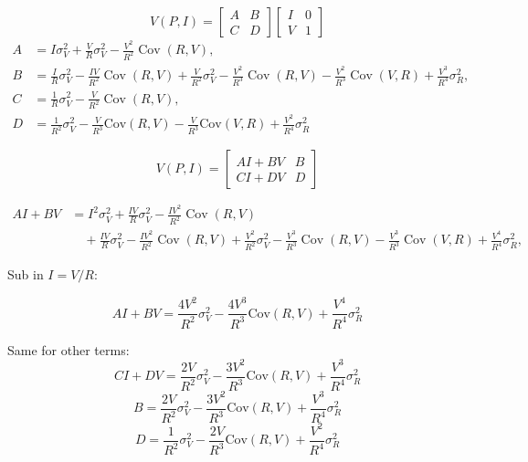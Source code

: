 \documentclass[10pt]{article}
\begin{document}
\begin{enumerate}[label=(\alph*)]
	      \[
		      V(P,I)=
		      \begin{bmatrix}
			      A & B \\[4pt]
			      C & D
		      \end{bmatrix}
		      \begin{bmatrix}
			      I & 0 \\[2pt]
			      V & 1
		      \end{bmatrix}
	      \]
	      \begin{align*}
		      A & = I\sigma_V^2 + \frac{V}{R}\sigma_V^2 - \frac{V^2}{R^2}\operatorname{Cov}(R,V),                                      \\[6pt]
		      B & = \frac{I}{R}\sigma_V^2 - \frac{IV}{R^2}\operatorname{Cov}(R,V)
		      + \frac{V}{R^2}\sigma_V^2 - \frac{V^2}{R^3}\operatorname{Cov}(R,V)
		      - \frac{V^2}{R^3}\operatorname{Cov}(V,R) + \frac{V^3}{R^4}\sigma_R^2,                                                    \\[6pt]
		      C & = \frac{1}{R}\sigma_V^2 - \frac{V}{R^2}\operatorname{Cov}(R,V),                                                      \\[6pt]
		      D & = \frac{1}{R^2} \sigma_V^2 - \frac{V}{R^3}\text{Cov}(R,V) - \frac{V}{R^3}\text{Cov}(V,R) + \frac{V^2}{R^4}\sigma_R^2
	      \end{align*}


	      \[ V(P,I) = \begin{bmatrix} AI + BV & B \\ C I + D V & D \end{bmatrix} \]


	      \begin{align*}
		      AI + BV & = I^2\sigma_V^2 + \frac{I V}{R}\sigma_V^2 - \frac{I V^2}{R^2}\operatorname{Cov}(R,V) \\
		              & \quad + \frac{IV}{R}\sigma_V^2 - \frac{IV^2}{R^2}\operatorname{Cov}(R,V)
		      + \frac{V^2}{R^2}\sigma_V^2 - \frac{V^3}{R^3}\operatorname{Cov}(R,V)
		      - \frac{V^3}{R^3}\operatorname{Cov}(V,R) + \frac{V^4}{R^4}\sigma_R^2,
	      \end{align*}

	      Sub in $I = V/R$:

	      \[ AI +BV = \frac{4V^2}{R^2} \sigma_V^2 - \frac{4V^3}{R^3}\text{Cov}(R,V) + \frac{V^4}{R^4}\sigma_R^2 \]

	      Same for other terms:
	      \[ C I + DV = \frac{2V}{R^2}\sigma_V^2 - \frac{3V^2}{R^3}\text{Cov}(R,V) + \frac{V^3}{R^4}\sigma_R^2 \]
	      \[ B = \frac{2V}{R^2}\sigma_V^2 - \frac{3V^2}{R^3}\text{Cov}(R,V) + \frac{V^3}{R^4}\sigma_R^2 \]
	      \[ D = \frac{1}{R^2}\sigma_V^2 - \frac{2V}{R^3}\text{Cov}(R,V) + \frac{V^2}{R^4}\sigma_R^2 \]


\end{enumerate}
\end{document}
